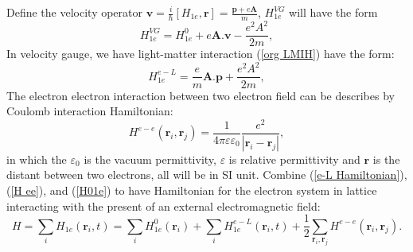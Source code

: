 \documentclass[12pt,english,a4paper]{article}
\begin{document}
	\quad Define the velocity operator $\textbf{v}= \frac{i}{\hbar} [H_{1e}, \textbf{r}] = \frac{\textbf{p}+e\textbf{A}}{m}$, $H^{VG}_{1e}$ will have the form
	\begin{equation}
		\label{H VG}
		H^{VG}_{1e} = H^0_{1e} + e \textbf{A}.\textbf{v} - \frac{e^2A^2}{2m},
	\end{equation}
	In velocity gauge, we have light-matter interaction (\ref{org LMIH})  have the form:
	\begin{equation}
		\label{e-L Hamiltonian}
		H^{e-L}_{1e} =\frac{e}{m} \textbf{A}.\textbf{p} + \frac{e^2 A^2}{2m},
	\end{equation}
	The electron electron interaction between two electron field can be describes by Coulomb interaction Hamiltonian:
	\begin{equation}
		\label{H ee}
		H^{e-e}(\textbf{r}_i, \textbf{r}_j) = \frac{1}{4\pi \varepsilon \varepsilon_0}\frac{e^2}{|\textbf{r}_i-\textbf{r}_j|},
	\end{equation}
	in which the $\varepsilon_0$ is the vacuum permittivity, $\varepsilon$ is relative permittivity and $\textbf{r}$ is the distant between two electrons, all will be in SI unit.
	Combine (\ref{e-L Hamiltonian}), (\ref{H ee}),  and (\ref{H01e}) to have Hamiltonian for the electron system in lattice interacting with the present of an external electromagnetic field:
	\begin{equation}
		\label{1st Quanti}
		H = \sum_{i} H_{1e}(\textbf{r}_i ,t) = \sum_{i} H^0_{1e} (\textbf{r}_i) + \sum_{i} H^{e-L}_{1e} (\textbf{r}_i,t) + \frac{1}{2} \sum_{\textbf{r}_i, \textbf{r}_j}H^{e-e}(\textbf{r}_i, \textbf{r}_j).
	\end{equation}
\end{document}
